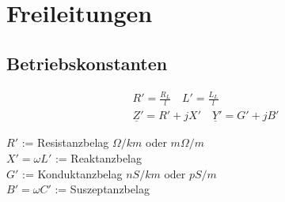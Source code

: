 \section{Freileitungen}
\subsection{Betriebskonstanten}

\begin{gather*}
    R' = \frac{R_L}{l} \quad
    L' = \frac{L_L}{l}\\
    \underline{Z}' = R' +jX' \quad
    \underline{Y}' = G' + jB'
\end{gather*}

$R'$ := Resistanzbelag $\Omega/km$ oder $m\Omega/m$\\
$X' = \omega L'$ := Reaktanzbelag\\
$G'$ := Konduktanzbelag $nS/km$ oder $pS/m$ \\
$B' = \omega C'$ := Suszeptanzbelag\\

